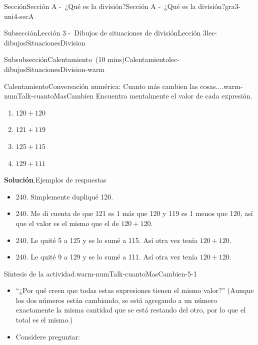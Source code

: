 \documentclass[oneside,10pt,]{article}
\newcommand{\blocktitlefont}{\relax}
\newlength{\fillinmaxwidth}
\newlength{\fillincontract}
\newlength{\charmaxwidth}\setlength{\charmaxwidth}{0.5em}
\newlength{\charminwidth}\setlength{\charminwidth}{0.1em}
\newlength{\fillinheight}
\newcommand{\fillintext}[1]{%
\setlength{\fillinmaxwidth}{#1\charmaxwidth}%
\setlength{\fillincontract}{#1\charminwidth}%
\setlength{\fillinheight}{\baselineskip}\addtolength{\fillinheight}{1.2pt}%
\strut\nobreak\leaders\vbox{\hrule width 0.3pt height 0.3pt \vskip -1.2pt}\hskip 1\fillinmaxwidth minus \fillincontract\nobreak\strut%
}
\begin{document}
\begin{sectionptx}{Sección}{Sección A -~¿Qué es la división?}{}{Sección A -~¿Qué es la división?}{}{}{gra3-uni4-secA}
\begin{subsectionptx}{Subsección}{Lección 3 -~Dibujos de situaciones de división}{}{Lección 3}{}{}{lec-dibujosSituacionesDivision}
\begin{subsubsectionptx}{Subsubsección}{Calentamiento~(10 mins)}{}{Calentamiento}{}{}{lec-dibujosSituacionesDivision-warm}
\begin{exploration}{Calentamiento}{Conversación numérica: Cuanto más cambien las cosas....}{warm-numTalk-cuantoMasCambien}
Encuentra mentalmente el valor de cada expresión.%
\par
%
\begin{enumerate}[label={\Alph*.}]
\item{}\(\displaystyle 120 + 120\)%
\item{}\(\displaystyle 121 + 119\)%
\item{}\(\displaystyle 125 + 115\)%
\item{}\(\displaystyle 129 + 111\)%
\end{enumerate}
%
\par\smallskip%
\noindent\textbf{\blocktitlefont Solución}.\hypertarget{warm-numTalk-cuantoMasCambien-3}{}\quad{}Ejemplos de respuestas%
\par
%
\begin{itemize}[label=\textbullet]
\item{}240. Simplemente dupliqué 120.%
\item{}240. Me di cuenta de que 121 es 1 más que 120 y 119 es 1 menos que 120, así que el valor es el mismo que el de \(120+120\).%
\item{}240. Le quité 5 a 125 y se lo sumé a 115. Así otra vez tenía \(120+120\).%
\item{}240. Le quité 9 a 129 y se lo sumé a 111. Así otra vez tenía \(120+120\).%
\end{itemize}
%
\end{exploration}%
\par
\begin{paragraphs}{Síntesis de la actividad.}{warm-numTalk-cuantoMasCambien-5-1}%
%
\begin{itemize}[label=\textbullet]
\item{}``¿Por qué creen que todas estas expresiones tienen el mismo valor?'' (Aunque los dos números están cambiando, se está agregando a un número exactamente la misma cantidad que se está restando del otro, por lo que el total es el mismo.)%
\item{}Considere preguntar:%

\end{itemize}
\end{paragraphs}
\end{subsubsectionptx}
\end{subsectionptx}
\end{sectionptx}
\end{document}
